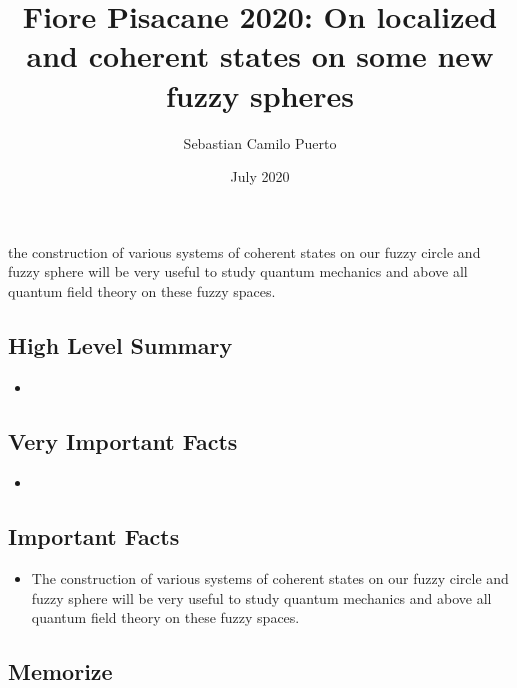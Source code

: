 \documentclass{article}
\title{Fiore Pisacane 2020: On localized and coherent states on some new fuzzy spheres}
\author{Sebastian Camilo Puerto}
\date{July 2020}
\begin{document}
\maketitle

\tableofcontents


the construction of various systems of coherent states on our fuzzy circle and
fuzzy sphere will be very useful to study quantum mechanics and above all quantum field
theory on these fuzzy spaces.
\subsection{High Level Summary}

    \begin{itemize}

    \item
    
    \end{itemize}

\subsection{Very Important Facts}

    \begin{itemize}

    \item 
    
    \end{itemize}

\subsection{Important Facts}

    \begin{itemize}

    \item The construction of various systems of coherent states on our fuzzy circle and fuzzy sphere will be very useful to study quantum mechanics and above all quantum field theory on these fuzzy spaces.
    
    \end{itemize}

\subsection{Memorize}
\end{document}
